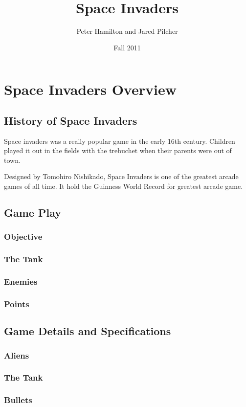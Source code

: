\documentclass[11pt,letter,oneside]{report}
\begin{document}
\title{Space Invaders}
\author{Peter Hamilton and Jared Pilcher}
\date{Fall 2011}
\maketitle

\tableofcontents

\chapter{Space Invaders Overview}
\section{History of Space Invaders}

Space invaders was a really popular game in the early 16th century.  Children played it out in the fields with the trebuchet when their parents were out of town.

Designed by Tomohiro Nishikado, Space Invaders is one of the greatest arcade games of all time.  It hold the Guinness World Record for greatest arcade game.


\section{Game Play}

\subsection{Objective}

\subsection{The Tank}

\subsection{Enemies}

\subsection{Points}

\section{Game Details and Specifications}

\subsection{Aliens}

\subsection{The Tank}

\subsection{Bullets}
\end{document}
